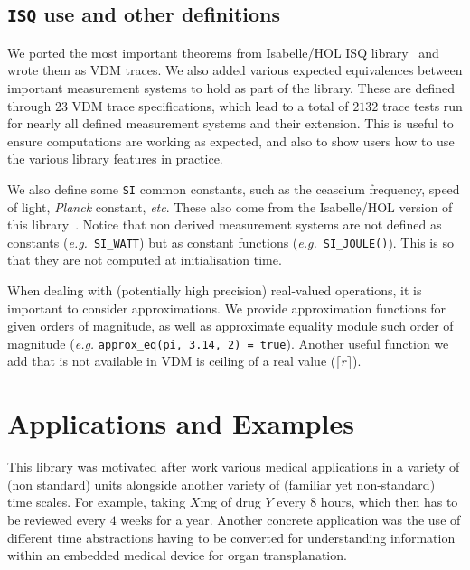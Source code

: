 \documentclass[runningheads,a4paper]{llncs}
\begin{document}
\subsection*{\texttt{ISQ} use and other definitions}

We ported the most important theorems from Isabelle/HOL ISQ library~\cite{Physical_Quantities-AFP} and wrote them as VDM traces. We also added various expected equivalences between important measurement systems to hold as part of the library. These are defined through \(23\) VDM trace specifications, which lead to a total of \(2132\) trace tests run for nearly all defined measurement systems and their extension. This is useful to ensure computations are working as expected, and also to show users how to use the various library features in practice. 

We also define some \texttt{SI} common constants, such as the ceaseium frequency, speed of light, \textit{Planck} constant, \textit{etc}. These also come from the Isabelle/HOL version of this library~\cite{Physical_Quantities-AFP}. Notice that non derived measurement systems are not defined as constants (\textit{e.g.}~\texttt{SI\_WATT}) but as constant functions (\textit{e.g.}~\texttt{SI\_JOULE()}). This is so that they are not computed at initialisation time.  

When dealing with (potentially high precision) real-valued operations, it is important to consider approximations. We provide approximation functions for given orders of magnitude, as well as approximate equality module such order of magnitude (\textit{e.g.} \texttt{approx\_eq(pi, 3.14, 2) = true}). Another useful function we add that is not available in VDM is ceiling of a real value (\(\lceil r \rceil\)). 

\section{Applications and Examples}\label{sec:Examples}

This library was motivated after work various medical applications in a variety of (non standard) units alongside another variety of (familiar yet non-standard) time scales. For example, taking \(X\)mg of drug \(Y\) every \(8\) hours, which then has to be reviewed every \(4\) weeks for a year. Another concrete application was the use of different time abstractions having to be converted for understanding information within an embedded medical device for organ transplanation.  
\end{document}
